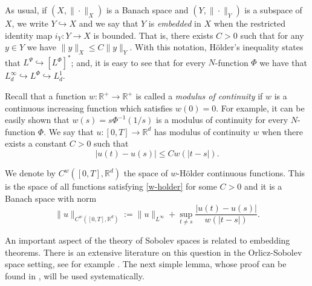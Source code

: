 \documentclass[twoside]{article}
\theoremstyle{remark}
\newcommand{\lphi}{L^{\Phi}}
\newcommand{\lpsi}{L^{\Psi}}
\newcommand{\rr}{\mathbb{R}}
\renewcommand{\leq}{\leqslant}
\newcounter{example}
\begin{document}
As usual, if $(X,\|\cdot\|_X)$ is a Banach space and $(Y,\|\cdot \|_Y)$ is a subspace of $X$,  we write $Y\hookrightarrow X$ and we say that $Y$ is \emph{embedded} in $X$  when the restricted identity map $i_Y:Y\to X$ is bounded. That is, there exists $C>0$ such that  for any $y\in Y$ we have $\|y\|_X\leq C\|y\|_Y$.  With this notation, H\"older's inequality states that  $\lpsi\hookrightarrow  \left[\lphi\right]^*$; and, it is easy to see that for every $N$-function $\Phi$ we have that $L^{\infty}_d\hookrightarrow\lphi \hookrightarrow L^1_d$.


 Recall that a function   $w:\mathbb{R}^+\to \mathbb{R}^+$ is called  a \emph{modulus of continuity} if $w$ is a continuous increasing function which satisfies $w(0)=0$. For example, it can be easily shown that $w(s)=s\Phi^{-1}(1/s)$ is a modulus of  continuity for every $N$-function $\Phi$.  We say that $u:[0,T]\to\rr^d$  has modulus of continuity $w$  when there exists a constant $C>0$ such that
\begin{equation}\label{w-holder}|u(t)-u(s)|\leq Cw(|t-s|).
\end{equation}


We denote by $C^w([0,T],\rr^d)$  the space of  $w$-H\"older continuous functions. This is the space of all functions satisfying \eqref{w-holder} for some $C>0$ and it is a Banach space with norm
\[\|u\|_{  C^w([0,T],\rr^d) }  :=\|u\|_{L^{\infty}}+\sup\limits_{t\neq s}\frac{|u(t)-u(s)|}{w(|t-s|)}.\]





 An important aspect of the theory of Sobolev spaces is related to embedding theorems. There is an extensive literature on this question in the  Orlicz-Sobolev space setting, see for example
 \cite{cianchi2000fully,cianchi1999some,claverooptimal,edmunds2000optimal,kerman2006optimal}.
The next simple lemma, whose proof can be found in \cite{ABGMS2015}, will be used systematically.
\end{document}
